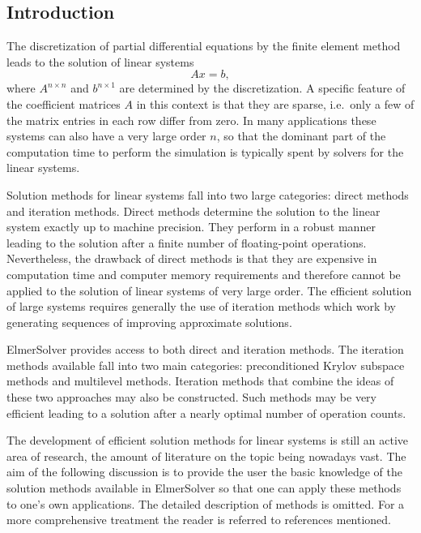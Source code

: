 \noindent

\begin{versiona}

\section{Introduction}

The discretization of partial differential equations by the finite element method
leads to the solution of linear systems 
\begin{equation}\label{ModelLinearSystem}
Ax = b,
\end{equation}
where $A^{n \times n}$ and $b^{n \times 1}$ are determined by the discretization.
A specific feature of the coefficient matrices $A$
in this context is that they are sparse, 
i.e.\ only a few of the matrix entries in each row differ from zero.
In many applications these systems can also have a very large order $n$, so that the 
dominant part of the computation time to perform the simulation is typically spent 
by solvers for the linear systems. 

Solution methods for linear systems fall into two large categories: direct methods
and iteration methods. Direct methods determine the solution to the linear system 
exactly up to machine precision. They perform in a robust manner leading to the
solution after a finite number of floating-point operations. Nevertheless,
the drawback of direct methods is that they are expensive 
in computation time and computer memory requirements and therefore cannot be applied
to the solution of linear systems of very large order. The efficient solution of large 
systems requires generally the use of iteration methods which work by generating sequences
of improving approximate solutions. 

ElmerSolver provides access to both direct and iteration methods.
The iteration methods available fall into two main categories: preconditioned
Krylov subspace methods and multilevel methods. Iteration methods that
combine the ideas of these two approaches may also be constructed. 
Such methods may be very efficient leading to a solution after a nearly
optimal number of operation counts.               

The development of efficient solution methods for linear systems is still an active area 
of research, the amount of literature on the topic being nowadays vast.   
The aim of the following discussion is to provide the user the basic knowledge of 
the solution methods available in ElmerSolver so that one can apply these
methods to one's own applications. The detailed description of methods
is omitted. For a more comprehensive treatment the reader is referred to references
mentioned.    


\end{versiona}

